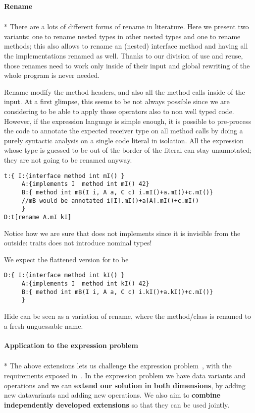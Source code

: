 \paragraph{Rename}${}_{}$\\*
There are a lots of different forms of rename in literature.
Here we present two variants: one to rename nested types in other nested types
and one to rename methods; this also allows to rename an (nested) interface method
and having all the implementations renamed as well.
Thanks to our division of use and reuse, those renames need to work only inside
of their input and global rewriting of the whole program is never needed.

Rename modify the method headers, and also all the method calls inside of the input.
At a first glimpse, this seems to be not always possible since we are considering to be able to apply those
operators also to non well typed code.
However, if the expression language is simple enough, it is possible to pre-process the code to
annotate the expected receiver type on all method calls by doing a purely syntactic analysis
on a single code literal in isolation. 
All the expression whose type is guessed to be out of the border of the literal can stay unannotated; they are not going to be renamed anyway.

\begin{lstlisting}
t:{ I:{interface method int mI() }
     A:{implements I  method int mI() 42}
     B:{ method int mB(I i, A a, C c) i.mI()+a.mI()+c.mI()}
     //mB would be annotated i[I].mI()+a[A].mI()+c.mI()
     }
D:t[rename A.mI kI]
\end{lstlisting}
 Notice how we are sure that \Q@C@ does not implements \Q@I@ since it is invisible from the outside:
 traits does not introduce nominal types!
 
 We expect the flattened version for \Q@D@ to be
\begin{lstlisting}
D:{ I:{interface method int kI() }
     A:{implements I  method int kI() 42}
     B:{ method int mB(I i, A a, C c) i.kI()+a.kI()+c.mI()}
     }
\end{lstlisting}

Hide can be seen as a variation of rename, where the method/class is renamed to a fresh unguessable name.



\paragraph{Application to the expression problem}${}_{}$\\*
The above extensions lets us challenge the expression problem~\cite{wadler1998expression},
with the requirements exposed in~\cite{scala}.
In the expression problem we have data variants and operations and we can
\textbf{extend our solution in both dimensions},
by adding new datavariants and adding new operations.
We also aim to \textbf{combine independently developed extensions} so
that they can be used jointly.

